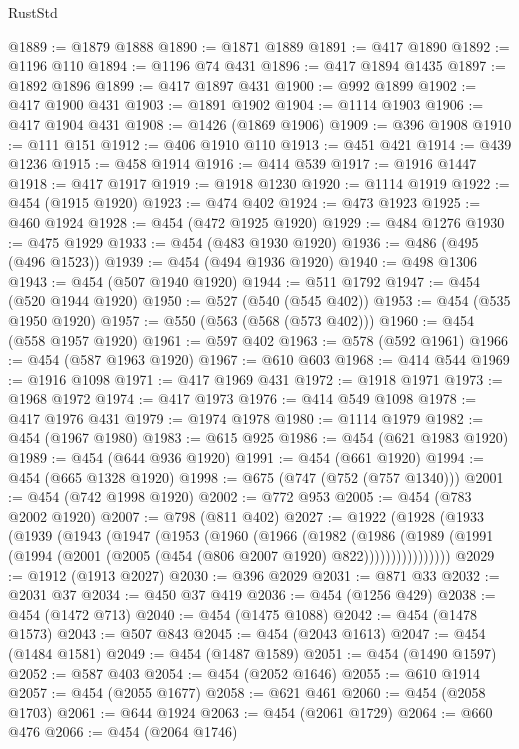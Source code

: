 \begin{lexlean}{RustStd}
\begin{coremodule}
@1889 := @1879 @1888
@1890 := @1871 @1889
@1891 := @417 @1890
@1892 := @1196 @110
@1894 := @1196 @74 @431
@1896 := @417 @1894 @1435
@1897 := @1892 @1896
@1899 := @417 @1897 @431
@1900 := @992 @1899
@1902 := @417 @1900 @431
@1903 := @1891 @1902
@1904 := @1114 @1903
@1906 := @417 @1904 @431
@1908 := @1426 (@1869 @1906)
@1909 := @396 @1908
@1910 := @111 @151
@1912 := @406 @1910 @110
@1913 := @451 @421
@1914 := @439 @1236
@1915 := @458 @1914
@1916 := @414 @539
@1917 := @1916 @1447
@1918 := @417 @1917
@1919 := @1918 @1230
@1920 := @1114 @1919
@1922 := @454 (@1915 @1920)
@1923 := @474 @402
@1924 := @473 @1923
@1925 := @460 @1924
@1928 := @454 (@472 @1925 @1920)
@1929 := @484 @1276
@1930 := @475 @1929
@1933 := @454 (@483 @1930 @1920)
@1936 := @486 (@495 (@496 @1523))
@1939 := @454 (@494 @1936 @1920)
@1940 := @498 @1306
@1943 := @454 (@507 @1940 @1920)
@1944 := @511 @1792
@1947 := @454 (@520 @1944 @1920)
@1950 := @527 (@540 (@545 @402))
@1953 := @454 (@535 @1950 @1920)
@1957 := @550 (@563 (@568 (@573 @402)))
@1960 := @454 (@558 @1957 @1920)
@1961 := @597 @402
@1963 := @578 (@592 @1961)
@1966 := @454 (@587 @1963 @1920)
@1967 := @610 @603
@1968 := @414 @544
@1969 := @1916 @1098
@1971 := @417 @1969 @431
@1972 := @1918 @1971
@1973 := @1968 @1972
@1974 := @417 @1973
@1976 := @414 @549 @1098
@1978 := @417 @1976 @431
@1979 := @1974 @1978
@1980 := @1114 @1979
@1982 := @454 (@1967 @1980)
@1983 := @615 @925
@1986 := @454 (@621 @1983 @1920)
@1989 := @454 (@644 @936 @1920)
@1991 := @454 (@661 @1920)
@1994 := @454 (@665 @1328 @1920)
@1998 := @675 (@747 (@752 (@757 @1340)))
@2001 := @454 (@742 @1998 @1920)
@2002 := @772 @953
@2005 := @454 (@783 @2002 @1920)
@2007 := @798 (@811 @402)
@2027 := @1922
    (@1928
      (@1933
        (@1939
          (@1943
            (@1947
              (@1953
                (@1960
                  (@1966
                    (@1982
                      (@1986
                        (@1989
                          (@1991 (@1994 (@2001 (@2005 (@454 (@806 @2007 @1920) @822))))))))))))))))
@2029 := @1912 (@1913 @2027)
@2030 := @396 @2029
@2031 := @871 @33
@2032 := @2031 @37
@2034 := @450 @37 @419
@2036 := @454 (@1256 @429)
@2038 := @454 (@1472 @713)
@2040 := @454 (@1475 @1088)
@2042 := @454 (@1478 @1573)
@2043 := @507 @843
@2045 := @454 (@2043 @1613)
@2047 := @454 (@1484 @1581)
@2049 := @454 (@1487 @1589)
@2051 := @454 (@1490 @1597)
@2052 := @587 @403
@2054 := @454 (@2052 @1646)
@2055 := @610 @1914
@2057 := @454 (@2055 @1677)
@2058 := @621 @461
@2060 := @454 (@2058 @1703)
@2061 := @644 @1924
@2063 := @454 (@2061 @1729)
@2064 := @660 @476
@2066 := @454 (@2064 @1746)

\end{coremodule}
\end{lexlean}

